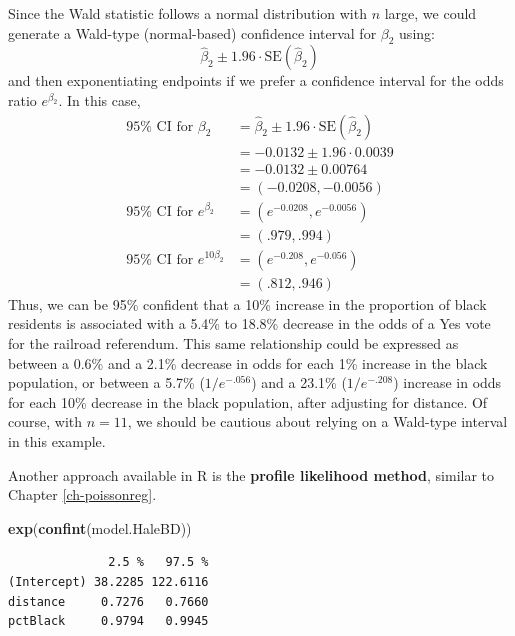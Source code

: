\documentclass[
]{krantz}
\newenvironment{Shaded}{\begin{snugshade}}{\end{snugshade}}
\newcommand{\KeywordTok}[1]{\textcolor[rgb]{0.27,0.27,0.27}{\textbf{#1}}}
\newcommand{\NormalTok}[1]{#1}
\begin{document}
Since the Wald statistic follows a normal distribution with \(n\) large, we could generate a Wald-type (normal-based) confidence interval for \(\beta_2\) using:
\[\hat\beta_2 \pm 1.96\cdot\textrm{SE}(\hat\beta_2)\]
and then exponentiating endpoints if we prefer a confidence interval for the odds ratio \(e^{\beta_2}\). In this case,
\begin{align}
95\% \textrm{ CI for } \beta_2 &= \hat{\beta}_2 \pm 1.96 \cdot \textrm{SE}(\hat{\beta}_2) \\
                               &= -0.0132 \pm 1.96 \cdot 0.0039 \\
                               &= -0.0132 \pm 0.00764 \\
                               &= (-0.0208, -0.0056) \\
95\% \textrm{ CI for } e^{\beta_2} &= (e^{-0.0208}, e^{-0.0056}) \\
                                   &= (.979, .994) \\
95\% \textrm{ CI for } e^{10\beta_2} &= (e^{-0.208}, e^{-0.056}) \\
                                      &= (.812, .946)
\end{align}
Thus, we can be 95\% confident that a 10\% increase in the proportion of black residents is associated with a 5.4\% to 18.8\% decrease in the odds of a Yes vote for the railroad referendum. This same relationship could be expressed as between a 0.6\% and a 2.1\% decrease in odds for each 1\% increase in the black population, or between a 5.7\% (\(1/e^{-.056}\)) and a 23.1\% (\(1/e^{-.208}\)) increase in odds for each 10\% decrease in the black population, after adjusting for distance. Of course, with \(n=11\), we should be cautious about relying on a Wald-type interval in this example.

Another approach available in R is the \textbf{profile likelihood method}, similar to Chapter \ref{ch-poissonreg}.

\begin{Shaded}
\begin{Highlighting}[]
\KeywordTok{exp}\NormalTok{(}\KeywordTok{confint}\NormalTok{(model.HaleBD))}
\end{Highlighting}
\end{Shaded}

\begin{verbatim}
              2.5 %   97.5 %
(Intercept) 38.2285 122.6116
distance     0.7276   0.7660
pctBlack     0.9794   0.9945
\end{verbatim}
\end{document}
